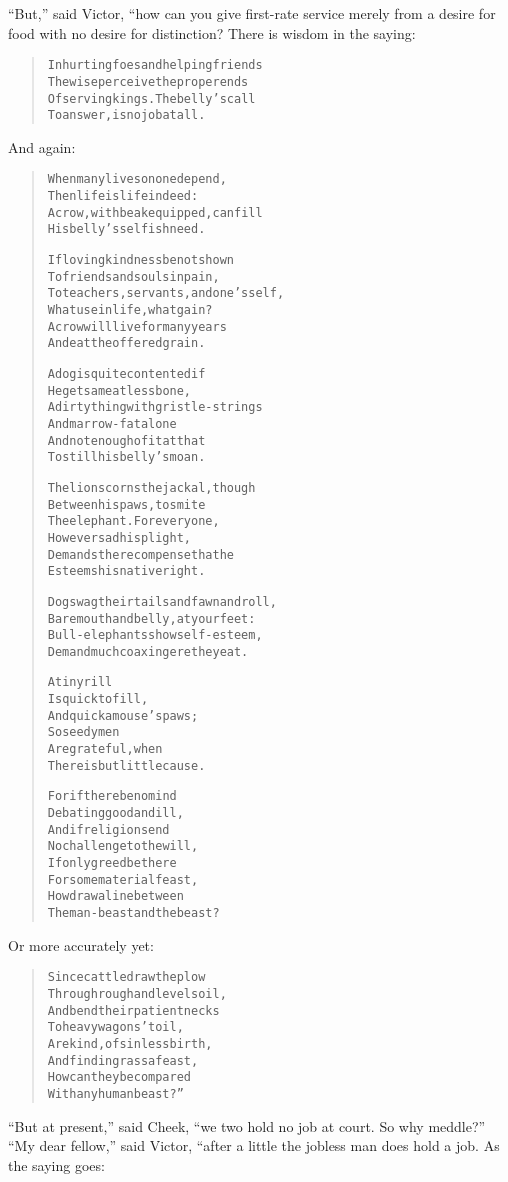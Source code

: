 \documentclass[article, twoside, 10pt]{memoir}
\renewenvironment{verbatim}{%
\begin{quote}%
\vskip -10pt%
\begin{alltt}\normalfont\small}{\end{alltt}%
\end{quote}%
\vskip -10pt
} %
\begin{document}
``But,'' said Victor, “how can you give first-rate service merely
from a desire for food with no desire for distinction? There is
wisdom in the saying:

\begin{verbatim}
In hurting foes and helping friends
The wise perceive the proper ends
Of serving kings. The belly's call
To answer, is no job at all.
\end{verbatim}
And again:

\begin{verbatim}
When many lives on one depend,
    Then life is life indeed:
A crow, with beak equipped, can fill
    His belly's selfish need.

If loving kindness be not shown
    To friends and souls in pain,
To teachers, servants, and one's self,
    What use in life, what gain?
A crow will live for many years
    And eat the offered grain.

A dog is quite contented if
    He gets a meatless bone,
A dirty thing with gristle-strings
    And marrow-fat alone{\textemdash}
And not enough of it at that
    To still his belly's moan.

The lion scorns the jackal, though
    Between his paws, to smite
The elephant. For everyone,
    However sad his plight,
Demands the recompense that he
    Esteems his native right.

Dogs wag their tails and fawn and roll,
    Bare mouth and belly, at your feet:
Bull-elephants show self-esteem,
    Demand much coaxing ere they eat.

A tiny rill
Is quick to fill,
    And quick a mouse's paws;
So seedy men
Are grateful, when
    There is but little cause.

For if there be no mind
    Debating good and ill,
And if religion send
    No challenge to the will,
If only greed be there
    For some material feast,
How draw a line between
    The man-beast and the beast?
\end{verbatim}
Or more accurately yet:

\begin{verbatim}
Since cattle draw the plow
    Through rough and level soil,
And bend their patient necks
    To heavy wagons' toil,
Are kind, of sinless birth,
    And find in grass a feast,
How can they be compared
    With any human beast?”
\end{verbatim}
``But at present,'' said Cheek,
``we two hold no job at court. So why meddle?'' ``My dear fellow,''
said Victor, “after a little the jobless man does hold a job. As
the saying goes:
\end{document}
